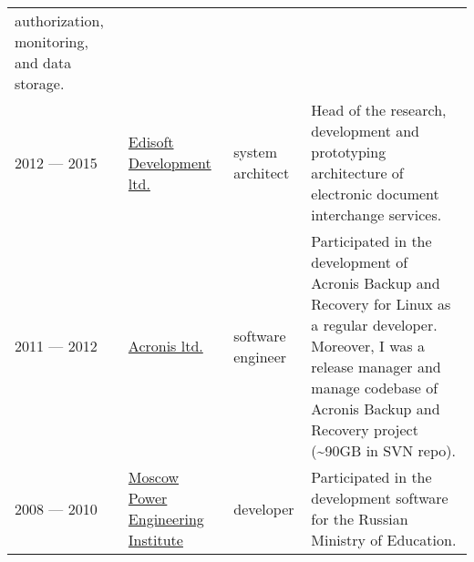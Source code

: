 \begin{longtable}[]{@{}llll@{}}
\begin{minipage}[t]{0.22\columnwidth}
authorization, monitoring, and data storage.\strut
\end{minipage}\tabularnewline
\begin{minipage}[t]{0.22\columnwidth}\raggedright
2012 --- 2015\strut
\end{minipage} & \begin{minipage}[t]{0.22\columnwidth}\raggedright
\href{https://ediweb.com}{Edisoft Development ltd.}\strut
\end{minipage} & \begin{minipage}[t]{0.22\columnwidth}\raggedright
system architect\strut
\end{minipage} & \begin{minipage}[t]{0.22\columnwidth}\raggedright
Head of the research, development and prototyping architecture of
electronic document interchange services.\strut
\end{minipage}\tabularnewline
\begin{minipage}[t]{0.22\columnwidth}\raggedright
2011 --- 2012\strut
\end{minipage} & \begin{minipage}[t]{0.22\columnwidth}\raggedright
\href{http://www.acronis.com}{Acronis ltd.}\strut
\end{minipage} & \begin{minipage}[t]{0.22\columnwidth}\raggedright
software engineer\strut
\end{minipage} & \begin{minipage}[t]{0.22\columnwidth}\raggedright
Participated in the development of Acronis Backup and Recovery for Linux
as a regular developer. Moreover, I was a release manager and manage
codebase of Acronis Backup and Recovery project (\textasciitilde90GB in
SVN repo).\strut
\end{minipage}\tabularnewline
\begin{minipage}[t]{0.22\columnwidth}\raggedright
2008 --- 2010\strut
\end{minipage} & \begin{minipage}[t]{0.22\columnwidth}\raggedright
\href{https://mpei.ru/lang/en/Pages/default.aspx}{Moscow Power
Engineering Institute}\strut
\end{minipage} & \begin{minipage}[t]{0.22\columnwidth}\raggedright
developer\strut
\end{minipage} & \begin{minipage}[t]{0.22\columnwidth}\raggedright
Participated in the development software for the Russian Ministry of
Education.\strut
\end{minipage}\tabularnewline
\bottomrule
\end{longtable}


